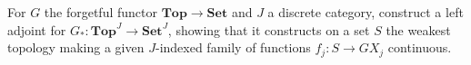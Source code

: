 For $G$ the forgetful functor $\mathbf{Top} \to \mathbf{Set}$ and $J$ a discrete category, construct a left adjoint for $G_*: \mathbf{Top}^J \to \mathbf{Set}^J$, showing that it constructs on a set $S$ the weakest topology making a given $J$-indexed family of functions $f_j: S \to GX_j$ continuous.
